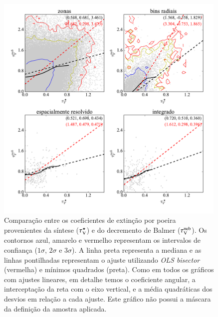 \begin{figure}
	\centering
	\includegraphics[width=0.99\textwidth]{figuras/CompareTauV.pdf}
	\caption[Comparação entre os coeficientes de extinção.] 
	{Comparação entre os coeficientes de extinção por poeira provenientes da síntese ($\tau_{\mathrm{V}}^\star$) e
do decremento de Balmer ($\tau_{\mathrm{V}}^{\mathrm{neb}}$). Os contornos azul, amarelo e vermelho representam os intervalos
de confiança ($1\sigma$, $2\sigma$ e $3\sigma$). A linha preta representa a mediana e as linhas
pontilhadas representam o ajuste utilizando {\em OLS bisector} (vermelha) e mínimos quadrados
(preta). Como em todos os gráficos com ajustes lineares, em detalhe temos o coeficiente angular, a
interceptação da reta com o eixo vertical, e a média quadráticas dos desvios em relação a cada
ajuste. Este gráfico não possui a máscara da definição da amostra aplicada.}
	\label{fig:tauVsynvsneb}
\end{figure}

